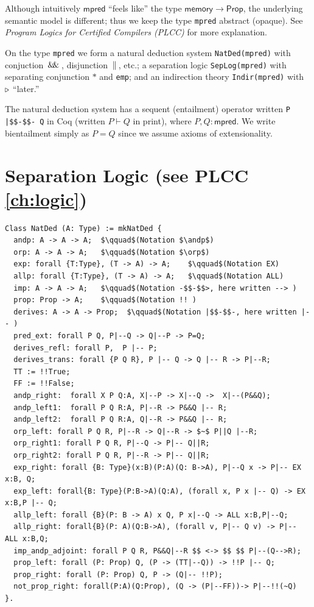 \documentclass[12pt,fleqn,openany,oneside,showtrims]{memoir}
\newcommand{\ychapter}[2]{\chapter[#1]{#1 \hfill \normalsize #2}}
\begin{document}
Although intuitively $\mathsf{mpred}$
``feels like'' the type $\mathsf{memory}\rightarrow\mathsf{Prop}$,
the underlying semantic model is different;
thus we keep the type \lstinline{mpred} abstract (opaque).
See \emph{Program Logics for Certified Compilers (PLCC)}
for more explanation.

On the type \lstinline{mpred}
we form a natural deduction  system
\lstinline{NatDed(mpred)} with
conjuction $\,\mathsf{\&\hspace{-.2em}\&}\,$, disjunction $\,\|\,$, etc.;
a separation logic
\lstinline{SepLog(mpred)} with
separating conjunction $*$ and \lstinline{emp};
and an indirection theory
\lstinline{Indir(mpred)} with $\triangleright$ ``later.''

The natural deduction system has a sequent
(entailment) operator written \lstinline{P |$$-$$- Q} in Coq
(written $P\vdash Q$ in print), where $P,Q:\mathsf{mpred}$.  We write
bientailment simply as $P=Q$ since we
assume axioms of extensionality.




\ychapter{Separation Logic}{(see PLCC \autoref{ch:logic})}
\begin{lstlisting}
Class NatDed (A: Type) := mkNatDed {
  andp: A -> A -> A;  $\qquad$(Notation $\andp$)
  orp: A -> A -> A;   $\qquad$(Notation $\orp$)
  exp: forall {T:Type}, (T -> A) -> A;    $\qquad$(Notation EX)
  allp: forall {T:Type}, (T -> A) -> A;   $\qquad$(Notation ALL)
  imp: A -> A -> A;   $\qquad$(Notation -$$-$$>, here written --> )
  prop: Prop -> A;    $\qquad$(Notation !! )
  derives: A -> A -> Prop;  $\qquad$(Notation |$$-$$-, here written |-- )
  pred_ext: forall P Q, P|--Q -> Q|--P -> P=Q;
  derives_refl: forall P,  P |-- P;
  derives_trans: forall {P Q R}, P |-- Q -> Q |-- R -> P|--R;
  TT := !!True;
  FF := !!False;
  andp_right:  forall X P Q:A, X|--P -> X|--Q ->  X|--(P&&Q);
  andp_left1:  forall P Q R:A, P|--R -> P&&Q |-- R;
  andp_left2:  forall P Q R:A, Q|--R -> P&&Q |-- R;
  orp_left: forall P Q R, P|--R -> Q|--R -> $~$ P||Q |--R;
  orp_right1: forall P Q R, P|--Q -> P|-- Q||R;
  orp_right2: forall P Q R, P|--R -> P|-- Q||R;
  exp_right: forall {B: Type}(x:B)(P:A)(Q: B->A), P|--Q x -> P|-- EX x:B, Q;
  exp_left: forall{B: Type}(P:B->A)(Q:A), (forall x, P x |-- Q) -> EX x:B,P |-- Q;
  allp_left: forall {B}(P: B -> A) x Q, P x|--Q -> ALL x:B,P|--Q;
  allp_right: forall{B}(P: A)(Q:B->A), (forall v, P|-- Q v) -> P|-- ALL x:B,Q;
  imp_andp_adjoint: forall P Q R, P&&Q|--R $$ <-> $$ $$ P|--(Q-->R);
  prop_left: forall (P: Prop) Q, (P -> (TT|--Q)) -> !!P |-- Q;
  prop_right: forall (P: Prop) Q, P -> (Q|-- !!P);
  not_prop_right: forall(P:A)(Q:Prop), (Q -> (P|--FF))-> P|--!!(~Q)
}.
\end{lstlisting}
\end{document}
